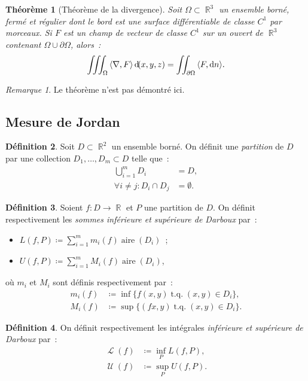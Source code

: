 \documentclass{article}
\DeclareMathOperator{\R}{\mathbb R}
\DeclareMathOperator{\tq}{ t.q. }
\DeclareMathOperator{\Larea}{\mathcal L}
\DeclareMathOperator{\Uarea}{\mathcal U}
\DeclareMathOperator{\aire}{aire}
\newcommand{\scpr}[2]{{\left\langle#1, #2\right\rangle}}
\newcommand{\divg}[1]{\scpr \nabla {#1}}
\newtheorem{thm}{Théorème}[section]
\theoremstyle{definition}
\newtheorem{déf}[thm]{Définition}
\theoremstyle{remark}
\newtheorem*{rmq}{Remarque}
\begin{document}
		\begin{thm}[Théorème de la divergence]\label{thm:divergence} Soit $\Omega \subset \R^3$ un ensemble borné, fermé et régulier dont le bord est une surface
		différentiable de classe $C^1$ par morceaux. Si $F$ est un champ de vecteur de classe $C^1$ sur un ouvert de $\R^3$ contenant $\Omega \cup \partial \Omega$,
		alors~:
		\[\iiint_\Omega\divg F\dif (x, y, z) = \iint_{\partial \Omega}\scpr F{\dif n}.\]
		\end{thm}

		\begin{rmq} Le théorème n'est pas démontré ici. \end{rmq}

	\subsection{Mesure de Jordan}
		\begin{déf} Soit $D \subset \R^2$ un ensemble borné. On définit une \emph{partition} de $D$ par une collection $D_1, \dotsc, D_m\subset D$ telle que~:
		\begin{align*}
			\bigcup_{i=1}^m D_i &= D, \\
			\forall i \neq j : D_i \cap D_j &= \emptyset.
		\end{align*}
		\end{déf}

		\begin{déf} Soient $f : D \to \R$ et $P$ une partition de $D$. On définit respectivement les \emph{sommes inférieure et supérieure de Darboux} par~:
		\begin{itemize}
			\item $L(f, P) \coloneqq \sum_{i=1}^m m_i(f)\aire(D_i)$~;
			\item $U(f ,P) \coloneqq \sum_{i=1}^m M_i(f)\aire(D_i)$,
		\end{itemize}
		où $m_i$ et $M_i$ sont définis respectivement par~:
		\begin{align*}
			m_i(f) &\coloneqq \inf\{f(x, y) \tq (x, y) \in D_i\}, \\
			M_i(f) &\coloneqq \sup\{(fx, y) \tq (x, y) \in D_i\}.
		\end{align*}
		\end{déf}

		\begin{déf} On définit respectivement les intégrales \emph{inférieure et supérieure de Darboux} par~:
		\begin{align*}
			\Larea(f) &\coloneqq \inf_P L(f, P), \\
			\Uarea(f) &\coloneqq \sup_P U(f, P).
		\end{align*}
		\end{déf}
\end{document}

